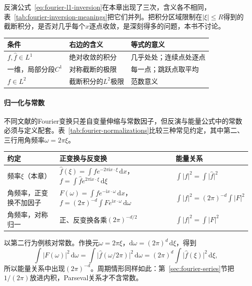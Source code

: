 反演公式~\eqref{eq:fourier-l1-inversion}在本章出现了三次，含义各不相同，表~\ref{tab:fourier-inversion-meanings}把它们并列。把积分区域限制在$\lvert\xi\rvert\leq R$得到的截断积分，是否对几乎每个$x$逐点收敛，是深刻得多的问题，本书不讨论。

\begin{BookInlineTable}
  \centering
  \small
  \begin{tabular}{@{}lll@{}}
    \toprule
    条件 & 右边的含义 & 等式的意义\\
    \midrule
    $f,\widehat f\in L^1$ & 绝对收敛的积分 & 几乎处处；连续点处逐点\\
    一维，局部分段$C^1$ & 对称截断的极限 & 每一点；跳跃点取平均\\
    $f\in L^2$ & 截断积分的$L^2$极限 & 范数意义\\
    \bottomrule
  \end{tabular}
  \caption{反演公式在三种条件下的含义。}
  \label{tab:fourier-inversion-meanings}
\end{BookInlineTable}

\paragraph{归一化与常数}

不同文献的Fourier变换只差自变量伸缩与常数因子，但反演与能量公式中的常数必须与定义配套。表~\ref{tab:fourier-normalizations}比较三种常见约定，其中第二、三行用角频率$\omega=2\pi\xi$。

\begin{BookInlineTable}
  \centering
  \small
  \begin{tabularx}{\linewidth}{@{}>{\raggedright\arraybackslash}p{20mm}>{\raggedright\arraybackslash}X>{\raggedright\arraybackslash}p{28mm}@{}}
    \toprule
    约定 & 正变换与反变换 & 能量关系\\
    \midrule
    频率$\xi$（本章） & $\widehat f(\xi)=\int fe^{-2\pi\mathrm ix\cdot\xi}\,\mathrm dx$，$f=\int\widehat fe^{2\pi\mathrm ix\cdot\xi}\,\mathrm d\xi$ & $\int\lvert f\rvert^2=\int\lvert\widehat f\rvert^2$\\
    角频率，正变换不加因子 & $F(\omega)=\int fe^{-\mathrm ix\cdot\omega}\,\mathrm dx$，$f=(2\pi)^{-d}\int Fe^{\mathrm ix\cdot\omega}\,\mathrm d\omega$ & $\int\lvert f\rvert^2=(2\pi)^{-d}\int\lvert F\rvert^2$\\
    角频率，对称归一 & 正、反变换各乘$(2\pi)^{-d/2}$ & $\int\lvert f\rvert^2=\int\lvert F\rvert^2$\\
    \bottomrule
  \end{tabularx}
  \caption{$\mathbb R^d$上Fourier变换的三种常见归一化。各行之间的换算是$F(\omega)=\widehat f(\omega/2\pi)$，对称归一化再乘以$(2\pi)^{-d/2}$；所有结论只差这些常数。}
  \label{tab:fourier-normalizations}
\end{BookInlineTable}

以第二行为例核对常数。作换元$\omega=2\pi\xi$，$\mathrm d\omega=(2\pi)^d\,\mathrm d\xi$，得到
\[
\int\lvert F(\omega)\rvert^2\,\mathrm d\omega=\int\lvert\widehat f(\omega/2\pi)\rvert^2\,\mathrm d\omega=(2\pi)^d\int\lvert\widehat f(\xi)\rvert^2\,\mathrm d\xi,
\]
所以能量关系中出现$(2\pi)^{-d}$。周期情形同样如此：第~\ref{sec:fourier-series}节把$1/(2\pi)$放进内积，Parseval关系才不含常数。
